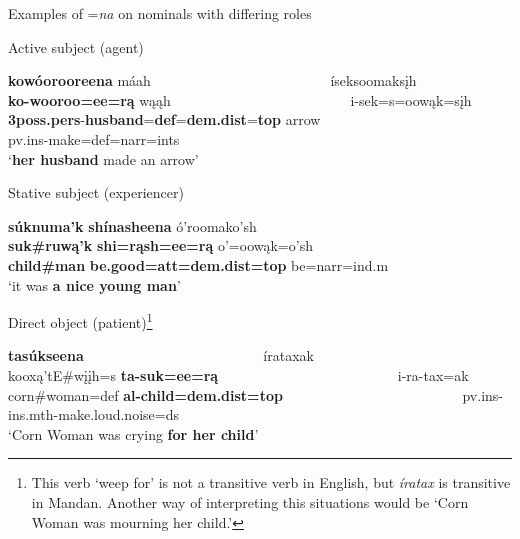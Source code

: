 \newpage
\begin{exe}

\item\label{NAexamples} Examples of =\textit{na} on nominals with differing roles

\begin{xlist}

\item\label{NAexamplesA} Active subject (agent)

    \glll \textbf{kowóorooreena} máah ~ ~ ~ ~ ~ ~ ~ ~ ~ ~ ~ ~ ~ ~ ~ íseksoomaksįh\\
    \textbf{ko-wooroo=ee=rą} wąąh ~ ~ ~ ~ ~ ~ ~ ~ ~ ~ ~ ~ ~ ~ ~ i-sek=s=oowąk=sįh\\
    \textbf{3poss.pers}-\textnormal{\bfseries husband}=\textbf{def}=\textbf{dem.dist}=\textbf{top} \textnormal{arrow} ~ ~ ~ ~ ~ ~ ~ ~ ~ ~ ~ ~ ~ ~ ~  pv.ins-\textnormal{make}=def=narr=ints\\
    \glt `\textbf{her husband} made an arrow' \citep[86]{hollow1973a}

\item\label{NAexamplesB} Stative subject (experiencer)

    \glll \textbf{súknuma'k} \textbf{shínasheena} ó'roomako'sh\\
        \textbf{\bfseries suk\#ruwą'k} \textbf{shi=rąsh=ee=rą} o'=oowąk=o'sh\\
        \textbf{\textnormal{\bfseries child}\#\textnormal{\bfseries man}} \textbf{\textnormal{\bfseries be.good}=att=dem.dist=top} \textnormal{be}=narr=ind.m\\
        \glt `it was \textbf{a nice young man}' \citep[125]{hollow1973a}

\item\label{NAexamplesC} Direct object (patient)\footnote{This verb `weep for' is not a transitive verb in English, but \textit{íratax} is transitive in Mandan. Another way of interpreting this situations would be `Corn Woman was mourning her child.'}

     \textbf{tasúkseena} ~ ~ ~ ~ ~ ~ ~ ~ ~ ~ ~ ~ ~ ~ ~ írataxak\\
    kooxą'tE\#wįįh=s \textbf{ta-suk=ee=rą} ~ ~ ~ ~ ~ ~ ~ ~ ~ ~ ~ ~ ~ ~ ~ i-ra-tax=ak\\
    \textnormal{corn}\#\textnormal{woman}=def \textbf{al-\textnormal{\bfseries child}=dem.dist=top} ~ ~ ~ ~ ~ ~ ~ ~ ~ ~ ~ ~ ~ ~ ~ pv.ins-ins.mth-\textnormal{make.loud.noise}=ds\\
    \glt `Corn Woman was crying \textbf{for her child}' \citep[112]{hollow1973a}


\end{xlist}
\end{exe}
